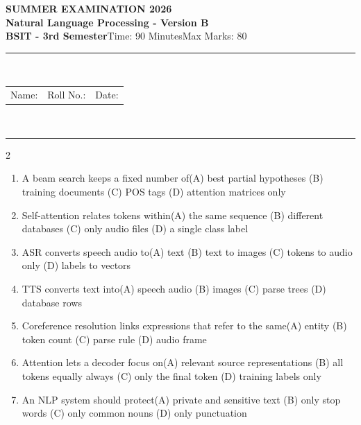 \documentclass[a4paper]{article}
\makeatletter
\newcommand{\examheader}{%
\begin{center}\textbf{\large SUMMER EXAMINATION 2026}\\[-1pt]
\textbf{\normalsize Natural Language Processing - Version B}\\[-1pt]
\textbf{BSIT - 3rd Semester}\quad Time: 90 Minutes\quad Max Marks: 80\\[-1pt]
\textcolor{black!65}{\rule{\linewidth}{0.45pt}}\\[-2pt]
\begin{tabularx}{\linewidth}{@{}X X X@{}}Name: \hrulefill & Roll No.: \hrulefill & Date: \hrulefill\end{tabularx}\\[-1pt]
\textcolor{black!65}{\rule{\linewidth}{0.45pt}}\end{center}}
\makeatother
\begin{document}
\examheader
\raggedcolumns
\begin{multicols*}{2}
\fontsize{8.5}{10}\selectfont
\begin{enumerate}
\item A beam search keeps a fixed number of\newline\hspace*{0.6em}(A) best partial hypotheses \quad (B) training documents \newline\hspace*{0.6em}(C) POS tags \quad (D) attention matrices only
\item Self-attention relates tokens within\newline\hspace*{0.6em}(A) the same sequence \quad (B) different databases \newline\hspace*{0.6em}(C) only audio files \quad (D) a single class label
\item ASR converts speech audio to\newline\hspace*{0.6em}(A) text \quad (B) text to images \newline\hspace*{0.6em}(C) tokens to audio only \quad (D) labels to vectors
\item TTS converts text into\newline\hspace*{0.6em}(A) speech audio \quad (B) images \newline\hspace*{0.6em}(C) parse trees \quad (D) database rows
\item Coreference resolution links expressions that refer to the same\newline\hspace*{0.6em}(A) entity \quad (B) token count \newline\hspace*{0.6em}(C) parse rule \quad (D) audio frame
\item Attention lets a decoder focus on\newline\hspace*{0.6em}(A) relevant source representations \quad (B) all tokens equally always \newline\hspace*{0.6em}(C) only the final token \quad (D) training labels only
\item An NLP system should protect\newline\hspace*{0.6em}(A) private and sensitive text \quad (B) only stop words \newline\hspace*{0.6em}(C) only common nouns \quad (D) only punctuation

\end{enumerate}
\end{multicols*}
\end{document}
